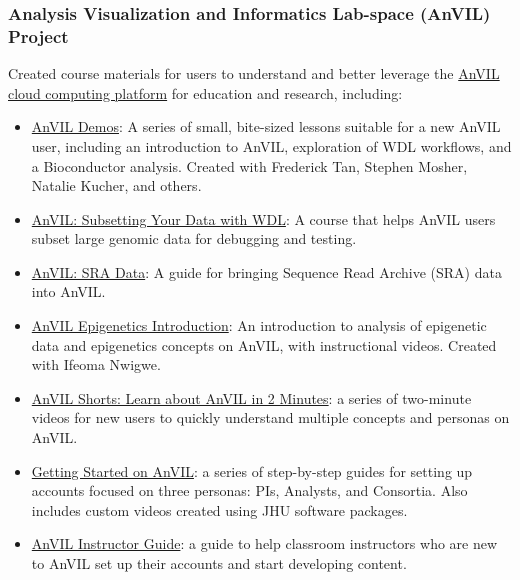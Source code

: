 \documentclass{cv}
\begin{document}
\subsubsection*{Analysis Visualization and Informatics Lab-space (AnVIL) Project}

Created course materials for users to understand and better leverage the \href{https://anvilproject.org/}{AnVIL cloud computing platform} for education and research, including: 

\begin{itemize}

\item \href{https://hutchdatascience.org/AnVIL_Demos/}{AnVIL Demos}: A series of small, bite-sized lessons suitable for a new AnVIL user, including an introduction to AnVIL, exploration of WDL workflows, and a Bioconductor analysis. Created with Frederick Tan, Stephen Mosher, Natalie Kucher, and others.

\item \href{https://hutchdatascience.org/AnVIL_Data_Subsetting}{AnVIL: Subsetting Your Data with WDL}: A course that helps AnVIL users subset large genomic data for debugging and testing.

\item \href{https://hutchdatascience.org/AnVIL_SRA_Data/}{AnVIL: SRA Data}: A guide for bringing Sequence Read Archive (SRA) data into AnVIL.

\item \href{https://hutchdatascience.org/AnVIL_Book_Epigenetics_Intro/}{AnVIL Epigenetics Introduction}: An introduction to analysis of epigenetic data and epigenetics concepts on AnVIL, with instructional videos. Created with Ifeoma Nwigwe.

\item \href{https://www.youtube.com/watch?v=tVh93e6TzCE\&list=PL6aYJ_0zJ4uCABkMngSYjPo_3c-nUUmio}{AnVIL Shorts: Learn about AnVIL in 2 Minutes}: a series of two-minute videos for new users to quickly understand multiple concepts and personas on AnVIL.

\item \href{https://jhudatascience.org/AnVIL_Book_Getting_Started/}{Getting Started on AnVIL}: a series of step-by-step guides for setting up accounts focused on three personas: PIs, Analysts, and Consortia. Also includes custom videos created using JHU software packages.

\item \href{https://jhudatascience.org/AnVIL_Book_Instructor_Guide/}{AnVIL Instructor Guide}: a guide to help classroom instructors who are new to AnVIL set up their accounts and start developing content.

\end{itemize}
\end{document}
